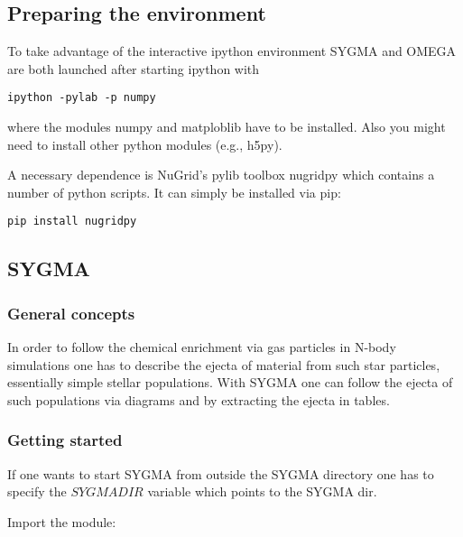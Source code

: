 
\subsection{Preparing the environment}%

To take advantage of the interactive ipython environment 
SYGMA and OMEGA are both launched after starting
ipython with


\begin{verbatim}
ipython -pylab -p numpy
\end{verbatim}

where the modules numpy and matploblib have to be installed.
Also you might need to install other python modules (e.g., h5py).

A necessary dependence is NuGrid's pylib toolbox nugridpy which
contains a number of python scripts.  It can simply be installed via
pip:

\begin{verbatim}
pip install nugridpy
\end{verbatim}



\subsection{SYGMA}

\subsubsection{General concepts}

In order to follow the chemical enrichment via gas particles
in N-body simulations one has to describe the ejecta of material
from such star particles, essentially simple stellar populations. 
With SYGMA one can follow the ejecta of such populations via
diagrams and by extracting the ejecta in tables.

\subsubsection{Getting started}

If one wants to start SYGMA from outside the SYGMA directory
one has to specify the $SYGMADIR$ variable which
points to the SYGMA dir.

Import the module:

